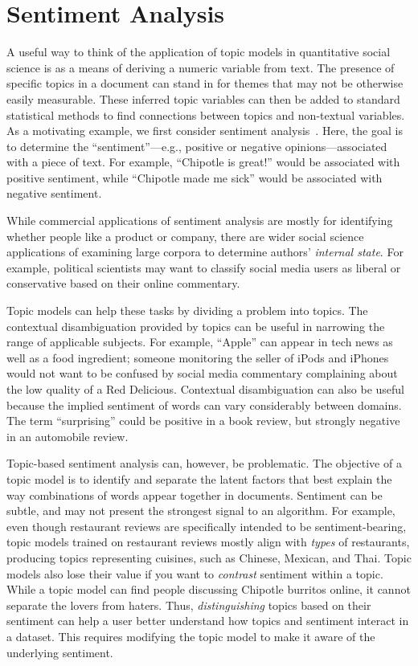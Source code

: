 \section{Sentiment Analysis}

A useful way to think of the application of topic models in quantitative social science is as a means of deriving a numeric variable from text.
The presence of specific topics in a document can stand in for themes that may not be otherwise easily measurable.
These inferred topic variables can then be added to standard statistical methods to find connections between topics and non-textual variables.
As a motivating example, we first consider sentiment analysis~\citep{pang-08}.  Here, the goal is to determine the
``sentiment''---e.g., positive or negative opinions---associated with
a piece of text.  For example, ``Chipotle is great!'' would be
associated with positive sentiment, while ``Chipotle made me sick''
would be associated with negative sentiment.

While commercial applications of sentiment analysis are mostly for
identifying whether people like a product or company, there are wider
social science applications of examining large corpora to determine
authors' \emph{internal state}.  For example, political scientists may
want to classify social media users as liberal or conservative based on their online
commentary.

Topic models can help these tasks by dividing a problem into topics.
The contextual disambiguation provided by topics can be useful in 
narrowing the range of applicable subjects.
For example, ``Apple'' can appear in tech news as well as a food
ingredient; someone monitoring the seller of iPods and iPhones would
not want to be confused by social media commentary complaining about 
the low quality of a Red Delicious. 
Contextual disambiguation can also be useful because the implied sentiment of words 
can vary considerably between domains.
The term ``surprising'' could be positive in a book review, but 
strongly negative in an automobile review.

Topic-based sentiment analysis can, however, be problematic.
The objective of a topic model is to identify and separate the latent factors that best explain the way combinations of words appear together in documents.
Sentiment can be subtle, and may not present the strongest signal to an algorithm.
For example, even though restaurant reviews are specifically intended to be sentiment-bearing, topic models trained on restaurant reviews mostly align with {\em types} of restaurants, producing topics representing cuisines, such as Chinese, Mexican, and Thai.
Topic models also lose their value if you want to \emph{contrast}
sentiment within a topic.  While a topic model can find people
discussing Chipotle burritos online, it cannot separate the lovers from
haters.  Thus, \emph{distinguishing} topics based on their sentiment
can help a user better understand how topics and sentiment interact in
a dataset.  This requires modifying the topic model to make it aware
of the underlying sentiment.

